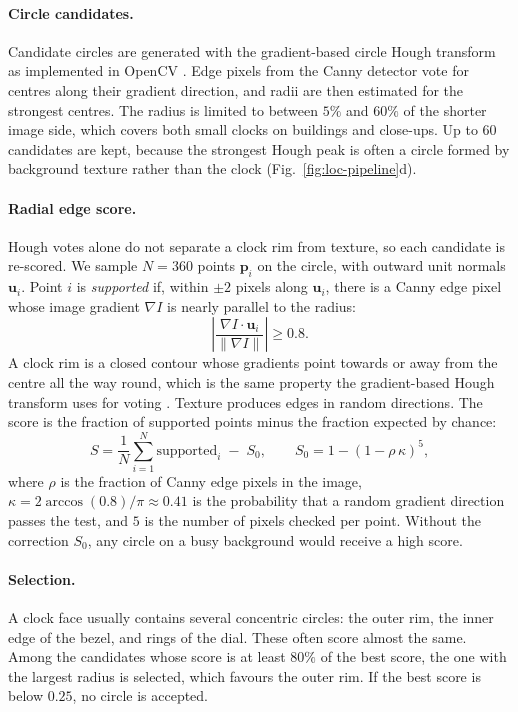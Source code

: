 \paragraph{Circle candidates.}
Candidate circles are generated with the gradient-based circle Hough transform
\citep{duda1972hough, kimme1975circles, yuen1990circles} as implemented in
OpenCV \citep{bradski2000opencv}. Edge pixels from the Canny detector
\citep{canny1986edge} vote for centres along their gradient direction, and
radii are then estimated for the strongest centres. The radius is limited to
between $5\%$ and $60\%$ of the shorter image side, which covers both small
clocks on buildings and close-ups. Up to $60$ candidates are kept, because the
strongest Hough peak is often a circle formed by background texture rather
than the clock (Fig.~\ref{fig:loc-pipeline}d).

\paragraph{Radial edge score.}
Hough votes alone do not separate a clock rim from texture, so each candidate
is re-scored. We sample $N = 360$ points $\mathbf{p}_i$ on the circle, with
outward unit normals $\mathbf{u}_i$. Point $i$ is \emph{supported} if, within
$\pm 2$ pixels along $\mathbf{u}_i$, there is a Canny edge pixel whose image
gradient $\nabla I$ is nearly parallel to the radius:
\begin{equation}
  \left| \frac{\nabla I \cdot \mathbf{u}_i}{\lVert \nabla I \rVert} \right| \geq 0.8 .
\end{equation}
A clock rim is a closed contour whose gradients point towards or away from
the centre all the way round, which is the same property the gradient-based
Hough transform uses for voting \citep{kimme1975circles}. Texture produces
edges in random directions. The score is the fraction of supported points
minus the fraction expected by chance:
\begin{equation}
  S = \frac{1}{N} \sum_{i=1}^{N} \text{supported}_i \;-\; S_0, \qquad
  S_0 = 1 - \left(1 - \rho\,\kappa\right)^{5},
\end{equation}
where $\rho$ is the fraction of Canny edge pixels in the image,
$\kappa = 2 \arccos(0.8) / \pi \approx 0.41$ is the probability that a random
gradient direction passes the test, and $5$ is the number of pixels checked
per point. Without the correction $S_0$, any circle on a busy background would
receive a high score.

\paragraph{Selection.}
A clock face usually contains several concentric circles: the outer rim, the
inner edge of the bezel, and rings of the dial. These often score almost the
same. Among the candidates whose score is at least $80\%$ of the best score,
the one with the largest radius is selected, which favours the outer rim. If
the best score is below $0.25$, no circle is accepted.

